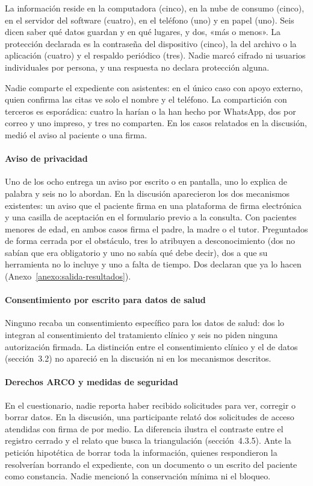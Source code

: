 \documentclass[12pt, a4paper]{article}
\begin{document}
La información reside en la computadora (cinco), en la nube de consumo
(cinco), en el servidor del software (cuatro), en el teléfono (uno) y en
papel (uno). Seis dicen saber qué datos guardan y en qué lugares, y dos,
«más o menos». La protección declarada es la contraseña del dispositivo
(cinco), la del archivo o la aplicación (cuatro) y el respaldo periódico
(tres). Nadie marcó cifrado ni usuarios individuales por persona, y una
respuesta no declara protección alguna.

Nadie comparte el expediente con asistentes: en el único caso con apoyo
externo, quien confirma las citas ve solo el nombre y el teléfono. La
compartición con terceros es esporádica: cuatro la harían o la han hecho
por WhatsApp, dos por correo y uno impreso, y tres no comparten. En los
casos relatados en la discusión, medió el aviso al paciente o una firma.
 
\paragraph{Aviso de privacidad}
Uno de los ocho entrega un aviso por escrito o en pantalla, uno lo
explica de palabra y seis no lo abordan. En la discusión aparecieron los
dos mecanismos existentes: un aviso que el paciente firma en una
plataforma de firma electrónica y una casilla de aceptación en el
formulario previo a la consulta. Con pacientes menores de edad, en ambos
casos firma el padre, la madre o el tutor. Preguntados de forma cerrada
por el obstáculo, tres lo atribuyen a desconocimiento (dos no sabían que
era obligatorio y uno no sabía qué debe decir), dos a que su herramienta
no lo incluye y uno a falta de tiempo. Dos declaran que ya lo hacen
(Anexo~\ref{anexo:salida-resultados}).
 
\paragraph{Consentimiento por escrito para datos de salud}
Ninguno recaba un consentimiento específico para los datos de salud:
dos lo integran al consentimiento del tratamiento clínico y seis no
piden ninguna autorización firmada. La distinción entre el
consentimiento clínico y el de datos (sección~3.2) no apareció en la
discusión ni en los mecanismos descritos.
 
\paragraph{Derechos ARCO y medidas de seguridad}
En el cuestionario, nadie reporta haber recibido solicitudes para ver,
corregir o borrar datos. En la discusión, una participante relató dos
solicitudes de acceso atendidas con firma de por medio. La diferencia
ilustra el contraste entre el registro cerrado y el relato que busca la
triangulación (sección~4.3.5). Ante la petición hipotética de borrar
toda la información, quienes respondieron la resolverían borrando el
expediente, con un documento o un escrito del paciente como constancia.
Nadie mencionó la conservación mínima ni el bloqueo.
\end{document}
